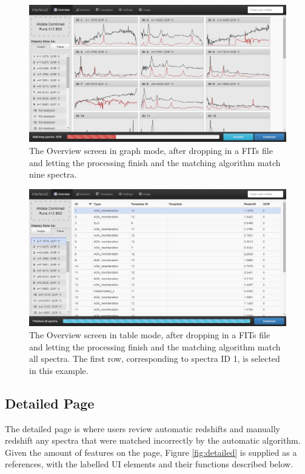 \documentclass[titlesmallcaps, examinerscopy, copyrightpage]{uqthesis}
\begin{document}
\begin{figure}[ht!]
\includegraphics[width=1\textwidth]{images/overviewGraph.png} 
\centering
\caption{The Overview screen in graph mode, after dropping in a FITs file and letting the processing finish and the matching algorithm match nine spectra.}
\label{fig:overviewGraph}
\end{figure}

\begin{figure}[ht!]
\includegraphics[width=1\textwidth]{images/overviewTable.png} 
\centering
\caption{The Overview screen in table mode, after dropping in a FITs file and letting the processing finish and the matching algorithm match all spectra. The first row, corresponding to spectra ID 1, is selected in this example.}
\label{fig:overviewTable}
\end{figure}





\subsection{Detailed Page}

The detailed page is where users review automatic redshifts and manually redshift any spectra that were matched incorrectly by the automatic algorithm. Given the amount of features on the page, Figure \ref{fig:detailed} is supplied as a references, with the labelled UI elements and their functions described below.
\end{document}
